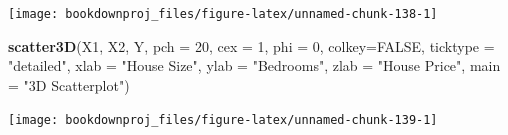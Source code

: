 \documentclass[
]{book}
\newenvironment{Shaded}{\begin{snugshade}}{\end{snugshade}}
\newcommand{\AttributeTok}[1]{\textcolor[rgb]{0.13,0.29,0.53}{#1}}
\newcommand{\ConstantTok}[1]{\textcolor[rgb]{0.56,0.35,0.01}{#1}}
\newcommand{\DecValTok}[1]{\textcolor[rgb]{0.00,0.00,0.81}{#1}}
\newcommand{\FunctionTok}[1]{\textcolor[rgb]{0.13,0.29,0.53}{\textbf{#1}}}
\newcommand{\NormalTok}[1]{#1}
\newcommand{\OtherTok}[1]{\textcolor[rgb]{0.56,0.35,0.01}{#1}}
\newcommand{\SpecialCharTok}[1]{\textcolor[rgb]{0.81,0.36,0.00}{\textbf{#1}}}
\newcommand{\StringTok}[1]{\textcolor[rgb]{0.31,0.60,0.02}{#1}}
\begin{document}
\begin{Shaded}
\end{Shaded}

\begin{center}\texttt{[image: bookdownproj\_files/figure-latex/unnamed-chunk-138-1]} \end{center}

\begin{Shaded}
\begin{Highlighting}[]
\FunctionTok{scatter3D}\NormalTok{(X1, X2, Y, }\AttributeTok{pch =} \DecValTok{20}\NormalTok{, }\AttributeTok{cex =} \DecValTok{1}\NormalTok{, }\AttributeTok{phi =} \DecValTok{0}\NormalTok{,}
          \AttributeTok{colkey=}\ConstantTok{FALSE}\NormalTok{, }\AttributeTok{ticktype =} \StringTok{"detailed"}\NormalTok{,}
          \AttributeTok{xlab =} \StringTok{"House Size"}\NormalTok{, }\AttributeTok{ylab =} \StringTok{"Bedrooms"}\NormalTok{,}
          \AttributeTok{zlab =} \StringTok{"House Price"}\NormalTok{, }\AttributeTok{main =} \StringTok{"3D Scatterplot"}\NormalTok{)}
\end{Highlighting}
\end{Shaded}

\begin{center}\texttt{[image: bookdownproj\_files/figure-latex/unnamed-chunk-139-1]} \end{center}
\end{document}
